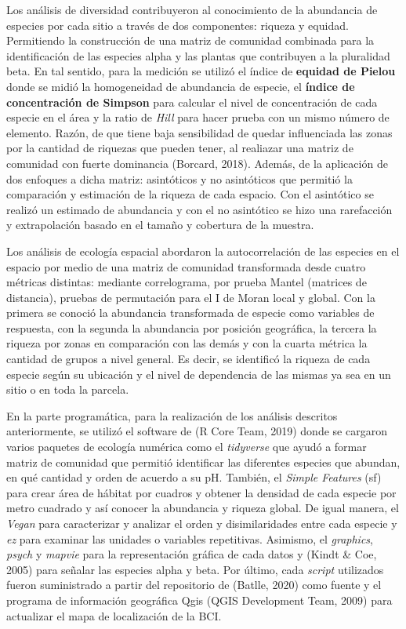 \documentclass[11pt,]{article}
\begin{document}
Los análisis de diversidad contribuyeron al conocimiento de la
abundancia de especies por cada sitio a través de dos componentes:
riqueza y equidad. Permitiendo la construcción de una matriz de
comunidad combinada para la identificación de las especies alpha y las
plantas que contribuyen a la pluralidad beta. En tal sentido, para la
medición se utilizó el índice de \textbf{equidad de Pielou} donde se
midió la homogeneidad de abundancia de especie, el \textbf{índice de
concentración de Simpson} para calcular el nivel de concentración de
cada especie en el área y la ratio de \emph{Hill} para hacer prueba con
un mismo número de elemento. Razón, de que tiene baja sensibilidad de
quedar influenciada las zonas por la cantidad de riquezas que pueden
tener, al realiazar una matriz de comunidad con fuerte dominancia
(Borcard, 2018). Además, de la aplicación de dos enfoques a dicha
matriz: asintóticos y no asintóticos que permitió la comparación y
estimación de la riqueza de cada espacio. Con el asintótico se realizó
un estimado de abundancia y con el no asintótico se hizo una rarefacción
y extrapolación basado en el tamaño y cobertura de la muestra.

Los análisis de ecología espacial abordaron la autocorrelación de las
especies en el espacio por medio de una matriz de comunidad transformada
desde cuatro métricas distintas: mediante correlograma, por prueba
Mantel (matrices de distancia), pruebas de permutación para el I de
Moran local y global. Con la primera se conoció la abundancia
transformada de especie como variables de respuesta, con la segunda la
abundancia por posición geográfica, la tercera la riqueza por zonas en
comparación con las demás y con la cuarta métrica la cantidad de grupos
a nivel general. Es decir, se identificó la riqueza de cada especie
según su ubicación y el nivel de dependencia de las mismas ya sea en un
sitio o en toda la parcela.

En la parte programática, para la realización de los análisis descritos
anteriormente, se utilizó el software de (R Core Team, 2019) donde se
cargaron varios paquetes de ecología numérica como el \emph{tidyverse}
que ayudó a formar matriz de comunidad que permitió identificar las
diferentes especies que abundan, en qué cantidad y orden de acuerdo a su
pH. También, el \emph{Simple Features} (sf) para crear área de hábitat
por cuadros y obtener la densidad de cada especie por metro cuadrado y
así conocer la abundancia y riqueza global. De igual manera, el
\emph{Vegan} para caracterizar y analizar el orden y disimilaridades
entre cada especie y \emph{ez} para examinar las unidades o variables
repetitivas. Asimismo, el \emph{graphics}, \emph{psych} y \emph{mapvie}
para la representación gráfica de cada datos y (Kindt \& Coe, 2005) para
señalar las especies alpha y beta. Por último, cada \emph{script}
utilizados fueron suministrado a partir del repositorio de (Batlle,
2020) como fuente y el programa de información geográfica Qgis (QGIS
Development Team, 2009) para actualizar el mapa de localización de la
BCI.
\end{document}
